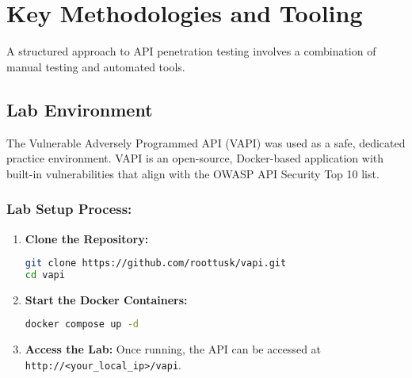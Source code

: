 \documentclass[12pt]{article}
\begin{document}
\section{Key Methodologies and Tooling}
A structured approach to API penetration testing involves a combination of manual testing and
automated tools.

\subsection*{Lab Environment}
The Vulnerable Adversely Programmed API (VAPI) was used as a safe, dedicated practice
environment. VAPI is an open-source, Docker-based application with built-in vulnerabilities
that align with the OWASP API Security Top 10 list.

\subsubsection*{Lab Setup Process:}
\begin{enumerate}
  \item \textbf{Clone the Repository:}
  \begin{lstlisting}[language=bash]
git clone https://github.com/roottusk/vapi.git
cd vapi
  \end{lstlisting}

  \item \textbf{Start the Docker Containers:}
  \begin{lstlisting}[language=bash]
docker compose up -d
  \end{lstlisting}

  \item \textbf{Access the Lab:} Once running, the API can be accessed at \texttt{http://<your\_local\_ip>/vapi}.
\end{enumerate}
\end{document}
